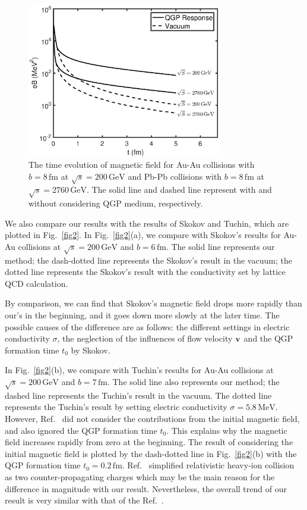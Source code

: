 \documentclass[preprint]{elsarticle}
\begin{document}
\begin{figure}
\centering
\includegraphics[width=8.5cm]{fig1.eps}
\caption{\label{fig1}The time evolution of magnetic field for Au-Au collisions with $b = 8\,\mathrm{fm}$ at $\sqrt{s}=200\,\mathrm{GeV}$ and Pb-Pb collisions with $b = 8\,\mathrm{fm}$ at $\sqrt{s} = 2760\,\mathrm{GeV}$. The solid line and dashed line represent with and without considering QGP medium, respectively.}
\end{figure}

We also compare our results with the results of Skokov\cite{McLerran:2013hla} and Tuchin\cite{Tuchin:2013ie,Tuchin:2015oka}, which are plotted in Fig.~\ref{fig2}. In Fig.~\ref{fig2}(a), we compare with Skokov's results for Au-Au collisions at $\sqrt{s} = 200\,\mathrm{GeV}$ and $b = 6\,\mathrm{fm}$. The solid line represents our method; the dash-dotted line represents the Skokov's result in the vacuum; the dotted line represents the Skokov's result with the conductivity set by lattice QCD calculation.

By comparison, we can find that Skokov's magnetic field drops more rapidly than our's in the beginning, and it goes down more slowly at the later time. The possible causes of the difference are as follows: the different settings in electric conductivity $\sigma$, the neglection of the influences of flow velocity $\vb{v}$ and the QGP formation time $t_0$ by Skokov.


In Fig.~\ref{fig2}(b), we compare with Tuchin's results for Au-Au collisions at $\sqrt{s} = 200\,\mathrm{GeV}$ and $b = 7\,\mathrm{fm}$. The solid line also represents our method; the dashed line represents the Tuchin's result in the vacuum. The dotted line represents the Tuchin's result by setting electric conductivity $\sigma = 5.8\,\mathrm{MeV}$\cite{Tuchin:2013ie}. However, Ref.~\cite{Tuchin:2013ie} did not consider the contributions from the initial magnetic field, and also ignored the QGP formation time $t_0$. This explains why the magnetic field increases rapidly from zero at the beginning. The result of  considering the initial magnetic field\cite{Tuchin:2015oka} is plotted by the dash-dotted line in Fig.~\ref{fig2}(b) with the QGP formation time $t_{0} = 0.2\,\mathrm{fm}$. Ref.~\cite{Tuchin:2015oka} simplified relativistic heavy-ion collision as two counter-propagating charges which may be the main reason for the difference in magnitude with our result. Nevertheless, the overall trend of our result is very similar with that of the Ref.~\cite{Tuchin:2015oka}.
\end{document}
